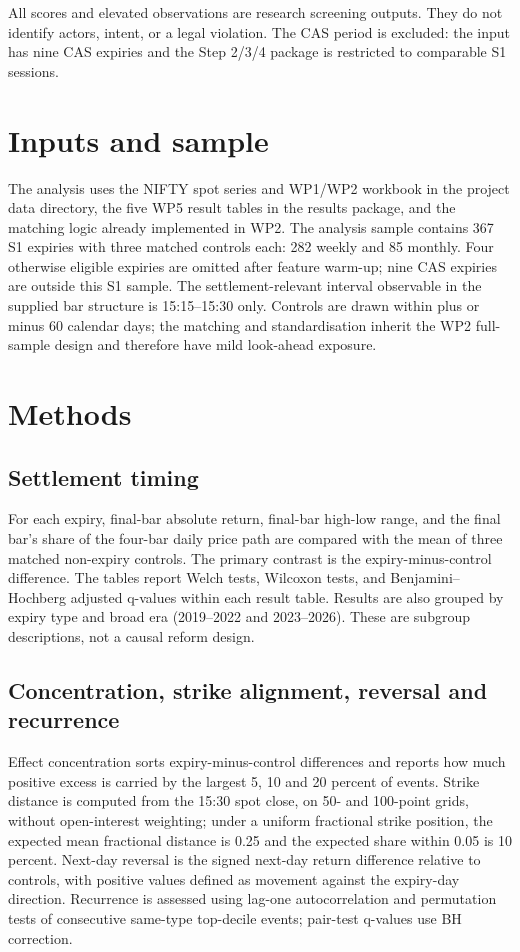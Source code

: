 \documentclass[11pt,a4paper]{article}
\begin{document}
All scores and elevated observations are research screening outputs. They do not identify actors, intent, or a legal violation. The CAS period is excluded: the input has nine CAS expiries and the Step 2/3/4 package is restricted to comparable S1 sessions.

\section{Inputs and sample}
The analysis uses the NIFTY spot series and WP1/WP2 workbook in the project data directory, the five WP5 result tables in the results package, and the matching logic already implemented in WP2. The analysis sample contains 367 S1 expiries with three matched controls each: 282 weekly and 85 monthly. Four otherwise eligible expiries are omitted after feature warm-up; nine CAS expiries are outside this S1 sample. The settlement-relevant interval observable in the supplied bar structure is 15:15--15:30 only. Controls are drawn within plus or minus 60 calendar days; the matching and standardisation inherit the WP2 full-sample design and therefore have mild look-ahead exposure.

\section{Methods}
\subsection{Settlement timing}
For each expiry, final-bar absolute return, final-bar high-low range, and the final bar's share of the four-bar daily price path are compared with the mean of three matched non-expiry controls. The primary contrast is the expiry-minus-control difference. The tables report Welch tests, Wilcoxon tests, and Benjamini--Hochberg adjusted q-values within each result table. Results are also grouped by expiry type and broad era (2019--2022 and 2023--2026). These are subgroup descriptions, not a causal reform design.

\subsection{Concentration, strike alignment, reversal and recurrence}
Effect concentration sorts expiry-minus-control differences and reports how much positive excess is carried by the largest 5, 10 and 20 percent of events. Strike distance is computed from the 15:30 spot close, on 50- and 100-point grids, without open-interest weighting; under a uniform fractional strike position, the expected mean fractional distance is 0.25 and the expected share within 0.05 is 10 percent. Next-day reversal is the signed next-day return difference relative to controls, with positive values defined as movement against the expiry-day direction. Recurrence is assessed using lag-one autocorrelation and permutation tests of consecutive same-type top-decile events; pair-test q-values use BH correction.
\end{document}

